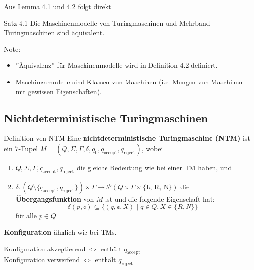 \documentclass[a4paper, 11pt]{article}
\begin{document}
        Aus Lemma 4.1 und 4.2 folgt direkt
        \begin{mainbox}{Satz 4.1}
            Die Maschinenmodelle von Turingmaschinen und Mehrband-Turingmaschinen sind äquivalent.
        \end{mainbox}
        Note: 
        \begin{itemize}
            \item ''Äquivalenz'' für Maschinenmodelle wird in Definition 4.2 definiert.
            \item Maschinenmodelle sind Klassen von Maschinen (i.e. Mengen von Maschinen mit gewissen Eigenschaften).
        \end{itemize}
    
        \subsection{Nichtdeterministische Turingmaschinen}
            \begin{mainbox}{Definition von NTM}
                Eine \textbf{nichtdeterministische Turingmaschine (NTM)} ist ein $7$-Tupel $M = (Q, \Sigma, \Gamma, \delta, q_0, q_{\text{accept}}, q_{\text{reject}})$, wobei 
                \begin{enumerate}[label=(\roman*)]
                    \item $Q, \Sigma, \Gamma, q_{\text{accept}}, q_{\text{reject}}$ die gleiche Bedeutung wie bei einer TM haben, und
                    \item $\delta: (Q \setminus \{q_{\text{accept}}, q_{\text{reject}}\}) \times \Gamma \to \mathcal{P}(Q \times \Gamma \times \{\text{L, R, N}\})$ 
                    die \textbf{Übergangsfunktion} von $M$ ist und die folgende Eigenschaft hat:
                    $$\delta(p, \cent) \subseteq \{(q, \cent, X) \mid q \in Q, X \in \{R, N\}\}$$
                    für alle $p \in Q$
                \end{enumerate}
            \end{mainbox}
            \textbf{Konfiguration} ähnlich wie bei TMs.
            \begin{center}
                Konfiguration akzeptierend $\iff$ enthält $q_{\text{accept}}$\\
                Konfiguration verwerfend $\iff$ enthält $q_{\text{reject}}$
            \end{center}
        
        
        
\end{document}
